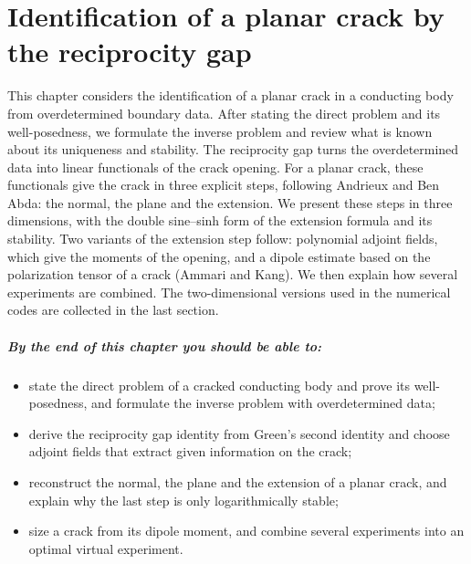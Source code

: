 \chapter{Identification of a planar crack by the reciprocity gap}\label{ch:rg}

This chapter considers the identification of a planar crack in a conducting body from overdetermined boundary data. After stating the direct problem and its well-posedness, we formulate the inverse problem and review what is known about its uniqueness and stability. The reciprocity gap turns the overdetermined data into linear functionals of the crack opening. For a planar crack, these functionals give the crack in three explicit steps, following Andrieux and Ben Abda: the normal, the plane and the extension. We present these steps in three dimensions, with the double sine--sinh form of the extension formula and its stability. Two variants of the extension step follow: polynomial adjoint fields, which give the moments of the opening, and a dipole estimate based on the polarization tensor of a crack (Ammari and Kang). We then explain how several experiments are combined. The two-dimensional versions used in the numerical codes are collected in the last section.

\paragraph{By the end of this chapter you should be able to:}
\begin{itemize}
  \item state the direct problem of a cracked conducting body and prove its
  well-posedness, and formulate the inverse problem with overdetermined data;
  \item derive the reciprocity gap identity from Green's second identity and
  choose adjoint fields that extract given information on the crack;
  \item reconstruct the normal, the plane and the extension of a planar
  crack, and explain why the last step is only logarithmically stable;
  \item size a crack from its dipole moment, and combine several
  experiments into an optimal virtual experiment.
\end{itemize}

